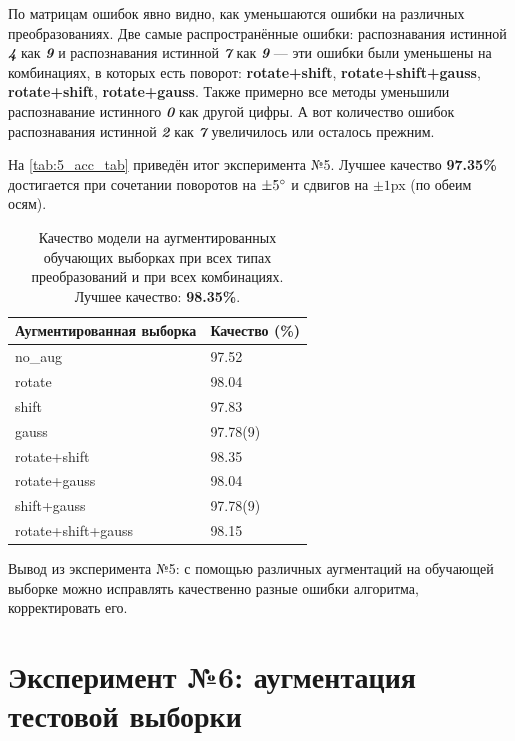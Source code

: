 \documentclass[12pt]{article}
\begin{document}
По матрицам ошибок явно видно, как уменьшаются ошибки на различных преобразованиях.
Две самые распространённые ошибки: распознавания истинной \textit{\textbf{4}} как \textit{\textbf{9}} и распознавания истинной \textit{\textbf{7}} как \textit{\textbf{9}} --- эти ошибки были уменьшены на комбинациях, в которых есть поворот: \textbf{rotate+shift}, \textbf{rotate+shift+gauss}, \textbf{rotate+shift}, \textbf{rotate+gauss}. Также примерно все методы уменьшили распознавание истинного \textit{\textbf{0}} как другой цифры. А вот количество ошибок распознавания истинной \textit{\textbf{2}} как \textit{\textbf{7}} увеличилось или осталось прежним.

На \autoref{tab:5_acc_tab} приведён итог эксперимента №5. Лучшее качество \textbf{97.35\%} достигается при сочетании поворотов на $\pm5\degree$ и сдвигов на $\pm1$px (по обеим осям).
\newpage
\begin{center}
\begin{table}[!h]
    \begin{center}
    \begin{tabular}[!h]{ | l | l | }
    \hline
    Аугментированная выборка & Качество (\%)\\ \hline
    no\_aug & 97.52\\
    rotate & 98.04\\
    shift & 97.83\\
    gauss & 97.78(9)\\
    rotate+shift & 98.35\\
    rotate+gauss & 98.04\\
    shift+gauss & 97.78(9)\\
    rotate+shift+gauss & 98.15\\
    \hline
    \end{tabular}
    \caption{Качество модели на аугментированных обучающих выборках при всех типах преобразований и при всех комбинациях. Лучшее качество: \textbf{98.35\%}.}
    \label{tab:5_acc_tab}
    \end{center}
\end{table}
\end{center}

Вывод из эксперимента №5: с помощью различных аугментаций на обучающей выборке можно исправлять качественно разные ошибки алгоритма, корректировать его.

\section{Эксперимент №6: аугментация тестовой выборки}
\end{document}
